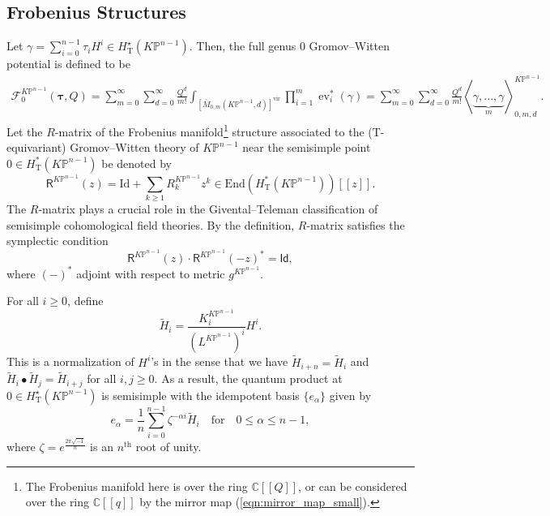 \documentclass[12pt]{amsart}
\numberwithin{equation}{section}
\newcommand{\KP}{K\mathbb{P}}
\begin{document}
\subsection{Frobenius Structures}\label{sec:FrobKP}
Let $\gamma=\sum_{i=0}^{n-1}\tau_iH^i\in H^{\star}_{\mathrm{T}}\left(\KP^{n-1}\right)$. Then, the full genus $0$ Gromov--Witten potential is defined to be 
\begin{equation}\label{eqn:full_GW_potential}
\begin{split}
    \mathcal{F}_0^{\KP^{n-1}}(\mathbf{\tau}, Q)
    =\sum_{m=0}^{\infty} \sum_{d=0}^{\infty} \frac{Q^d}{m !}\int_{\left[\overline{M}_{0, m}\left(\KP^{n-1}, d\right)\right]^{\mathrm{vir}}}  \prod_{i=1}^m \operatorname{ev}_i^*(\gamma)
    =\sum_{m=0}^{\infty} \sum_{d=0}^{\infty} \frac{Q^d}{m !}\left\langle \underbrace{\gamma,...,\gamma}_{m}\right\rangle_{0, m, d}^{\KP^{n-1}}.
\end{split}
\end{equation}
Let the $R$-matrix of the Frobenius manifold\footnote{The Frobenius manifold here is over the ring $\mathbb{C}[\![Q]\!]$, or can be considered over the ring $\mathbb{C}[\![q]\!]$ by the mirror map (\ref{eqn:mirror_map_small}).} structure associated to the ($\mathrm{T}$-equivariant) Gromov--Witten theory of $\KP^{n-1}$ near the semisimple point $0\in H^*_{\mathrm{T}}(\KP^{n-1}) $ be denoted by 
\begin{equation*}
    \mathsf{R}^{\KP^{n-1}}(z)=\text{Id}+\sum_{k\geq 1} R^{\KP^{n-1}}_k z^k\in \text{End}(H^*_{\mathrm{T}}(\KP^{n-1}))[\![z]\!].
\end{equation*}
The $R$-matrix plays a crucial role in the Givental--Teleman classification of semisimple cohomological field theories. By the definition, $R$-matrix satisfies the symplectic condition 
\begin{equation*}
    \mathsf{R}^{\KP^{n-1}}(z)\cdot \mathsf{R}^{\KP^{n-1}}(-z)^*=\mathsf{Id},
\end{equation*}
where $(-)^*$ adjoint with respect to metric $g^{\KP^{n-1}}$.

For all $i\geq{0}$, define
\begin{equation}\label{def:phi_tilde}
\widetilde{H}_i=\frac{K^{\KP^{n-1}}_i}{(L^{\KP^{n-1}})^i}H^i.
 \end{equation}
This is a normalization of $H^i$'s in the sense that we have $\widetilde{H}_{i+n}=\widetilde{H}_{i}$ and $\widetilde{H}_i\bullet\widetilde{H}_j=\widetilde{H}_{i+j}$ for all $i,j\geq{0}$. As a result, the quantum product at $0\in H^{\star}_{\mathrm{T}}\left(\KP^{n-1}\right)$ is semisimple with the idempotent basis $\{e_\alpha\}$ given by 
\begin{equation}\label{def:idempotent}
    e_{\alpha}=\frac{1}{n}\sum_{i=0}^{n-1}\zeta^{-\alpha{i}}\widetilde{H}_i\quad\text{for}\quad 0\leq\alpha\leq n-1,
\end{equation}
where $\zeta=e^{\frac{2\pi\sqrt{-1}}{n}}$ is an $n^{\text{th}}$ root of unity.
\end{document}

